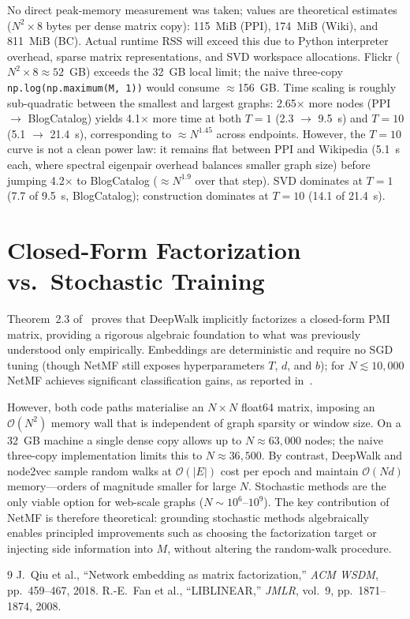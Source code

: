 \documentclass[10pt,letterpaper]{article}
\begin{document}
No direct peak-memory measurement was taken; values are theoretical estimates ($N^2{\times}8$
bytes per dense matrix copy): 115~MiB (PPI), 174~MiB (Wiki), and 811~MiB (BC).
Actual runtime RSS will exceed this due to Python interpreter overhead, sparse matrix representations,
and SVD workspace allocations.
Flickr ($N^2{\times}8\approx52$~GB) exceeds the 32~GB local limit; the naive three-copy
\texttt{np.log(np.maximum(M,\,1))} would consume $\approx$156~GB.
Time scaling is roughly sub-quadratic between the smallest and largest graphs:
2.65$\times$ more nodes (PPI $\to$ BlogCatalog) yields 4.1$\times$ more time at both
$T{=}1$ (2.3 $\to$ 9.5~s) and $T{=}10$ (5.1 $\to$ 21.4~s), corresponding to $\approx N^{1.45}$
across endpoints. However, the $T{=}10$ curve is not a clean power law: it remains flat
between PPI and Wikipedia (5.1~s each, where spectral eigenpair overhead balances smaller graph size)
before jumping 4.2$\times$ to BlogCatalog ($\approx N^{1.9}$ over that step).
SVD dominates at $T{=}1$ (7.7 of 9.5~s, BlogCatalog); construction dominates at $T{=}10$ (14.1 of 21.4~s).

\section{Closed-Form Factorization vs.\ Stochastic Training}

Theorem~2.3 of~\cite{netmf} proves that DeepWalk implicitly factorizes a closed-form PMI matrix,
providing a rigorous algebraic foundation to what was previously understood only empirically.
Embeddings are deterministic and require no SGD tuning (though NetMF still exposes hyperparameters
$T$, $d$, and $b$); for $N\lesssim10{,}000$ NetMF achieves significant classification gains,
as reported in~\cite{netmf}.

However, both code paths materialise an $N{\times}N$ float64 matrix, imposing an $\mathcal{O}(N^2)$
memory wall that is independent of graph sparsity or window size.
On a 32~GB machine a single dense copy allows up to $N\approx63{,}000$ nodes;
the naive three-copy implementation limits this to $N\approx36{,}500$.
By contrast, DeepWalk and node2vec sample random walks at $\mathcal{O}(|E|)$ cost per epoch and
maintain $\mathcal{O}(Nd)$ memory---orders of magnitude smaller for large $N$.
Stochastic methods are the only viable option for web-scale graphs ($N\sim10^6$--$10^9$).
The key contribution of NetMF is therefore theoretical: grounding stochastic methods algebraically
enables principled improvements such as choosing the factorization target or injecting side information
into $M$, without altering the random-walk procedure.


\begin{thebibliography}{9}
J.~Qiu et al., ``Network embedding as matrix factorization,'' \textit{ACM WSDM}, pp.\ 459--467, 2018.
R.-E.~Fan et al., ``LIBLINEAR,'' \textit{JMLR}, vol.\ 9, pp.\ 1871--1874, 2008.
\end{thebibliography}
\end{document}
